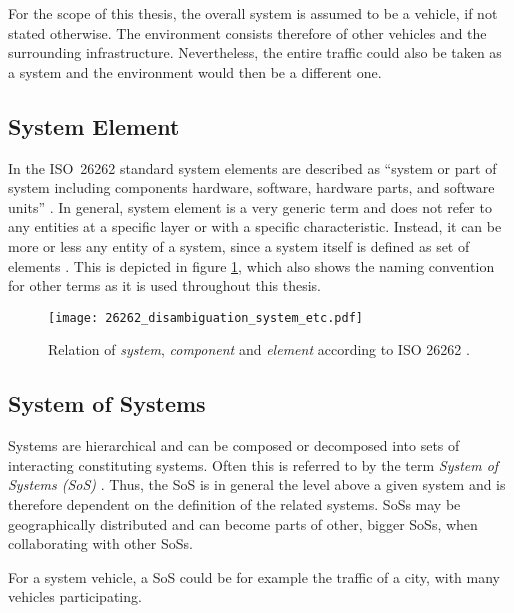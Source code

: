 For the scope of this thesis, the overall system is assumed to be a vehicle, if not stated otherwise. The environment consists therefore of other vehicles and the surrounding infrastructure. Nevertheless, the entire traffic could also be taken as a system and the environment would then be a different one.



\subsection{System Element}
\label{sec:system_element}
In the \mbox{ISO 26262} standard system elements are described as ``system or part of system including components hardware, software, hardware parts, and software units'' \cite{iso26262:1}. In general, system element is a very generic term and does not refer to any entities at a specific layer or with a specific characteristic. Instead, it can be more or less any entity of a system, since a system itself is defined as set of elements \cite{iso26262:1}. This is depicted in figure \ref{fig:26262_disambiguation}, which also shows the naming convention for other terms as it is used throughout this thesis.

\begin{figure}[!htbp]
\centering
\texttt{[image: 26262\_disambiguation\_system\_etc.pdf]}

\caption{Relation of \emph{system}, \emph{component} and \emph{element} according to ISO 26262 \cite{iso26262:course1}.}
\label{fig:26262_disambiguation}
\end{figure}


\subsection{System of Systems}
Systems are hierarchical and can be composed or decomposed into sets of interacting constituting systems. Often this is referred to by the term \emph{System of Systems (SoS)} \cite[p.7]{genesys}. Thus, the SoS is in general the level above a given system and is therefore dependent on the definition of the related systems. SoSs may be geographically distributed and can become parts of other, bigger SoSs, when collaborating with other SoSs.

For a system vehicle, a SoS could be for example the traffic of a city, with many vehicles participating.


